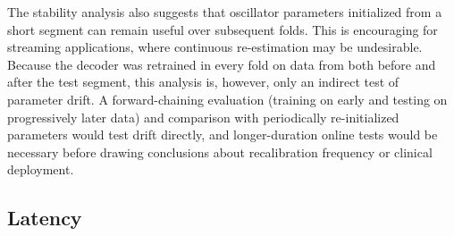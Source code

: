 \documentclass{iopjournal}
\begin{document}
The stability analysis also suggests that oscillator parameters initialized from a short segment can remain useful over subsequent folds. This is encouraging for streaming applications, where continuous re-estimation may be undesirable. Because the decoder was retrained in every fold on data from both before and after the test segment, this analysis is, however, only an indirect test of parameter drift. A forward-chaining evaluation (training on early and testing on progressively later data) and comparison with periodically re-initialized parameters would test drift directly, and longer-duration online tests would be necessary before drawing conclusions about recalibration frequency or clinical deployment.

\subsection{Latency}
\end{document}
